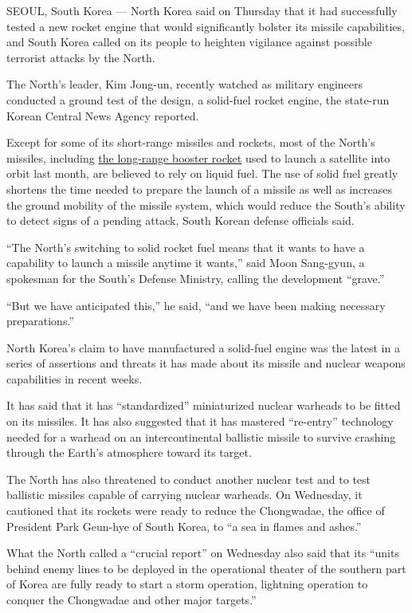 SEOUL, South Korea --- North Korea said on Thursday that it had
successfully tested a new rocket engine that would significantly bolster
its missile capabilities, and South Korea called on its people to
heighten vigilance against possible terrorist attacks by the North.

The North's leader, Kim Jong-un, recently watched as military engineers
conducted a ground test of the design, a solid-fuel rocket engine, the
state-run Korean Central News Agency reported.

Except for some of its short-range missiles and rockets, most of the
North's missiles, including
\href{http://www.nytimes3xbfgragh.onion/2016/02/07/world/asia/north-korea-moves-up-rocket-launching-plan.html}{the
long-range booster rocket} used to launch a satellite into orbit last
month, are believed to rely on liquid fuel. The use of solid fuel
greatly shortens the time needed to prepare the launch of a missile as
well as increases the ground mobility of the missile system, which would
reduce the South's ability to detect signs of a pending attack, South
Korean defense officials said.

``The North's switching to solid rocket fuel means that it wants to have
a capability to launch a missile anytime it wants,'' said Moon
Sang-gyun, a spokesman for the South's Defense Ministry, calling the
development ``grave.''

``But we have anticipated this,'' he said, ``and we have been making
necessary preparations.''

North Korea's claim to have manufactured a solid-fuel engine was the
latest in a series of assertions and threats it has made about its
missile and nuclear weapons capabilities in recent weeks.

It has said that it has ``standardized'' miniaturized nuclear warheads
to be fitted on its missiles. It has also suggested that it has mastered
``re-entry'' technology needed for a warhead on an intercontinental
ballistic missile to survive crashing through the Earth's atmosphere
toward its target.

The North has also threatened to conduct another nuclear test and to
test ballistic missiles capable of carrying nuclear warheads. On
Wednesday, it cautioned that its rockets were ready to reduce the
Chongwadae, the office of President Park Geun-hye of South Korea, to ``a
sea in flames and ashes.''

What the North called a ``crucial report'' on Wednesday also said that
its ``units behind enemy lines to be deployed in the operational theater
of the southern part of Korea are fully ready to start a storm
operation, lightning operation to conquer the Chongwadae and other major
targets.''


